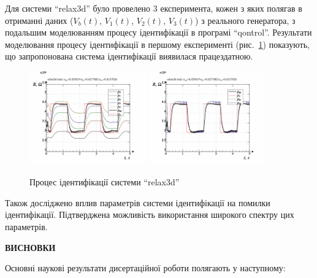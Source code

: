 \documentclass[a4paper,13pt]{atuaref}
\newcommand{\xsect}[1]{\medskip\begin{center}\textbf{#1}\end{center}\medskip\penalty10000}
\begin{document}
Для системи ``relax3d'' було провелено 3 експеримента, кожен з яких полягав в отриманні даних
($ V_b (t) $, $ V_1 (t) $, $ V_2 (t) $, $ V_3(t) $) з реального генератора, з подальшим моделюванням процесу ідентифікації в
програмі ``qontrol''.
Результати моделювання процесу ідентифікації в першому експерименті
(рис.~\ref{atu:f:relax3d_id_1}) показують, що запропонована система
ідентифікації виявилася працездатною.

\begin{figure}[htb!]
  \centerline{
    \includegraphics[width=0.45\textwidth]{p7/p/relax3d_read_id2-p_p_00.png}
    \hfill
    \includegraphics[width=0.45\textwidth]{p7/p/relax3d_read_id2-p_pp_00.png}
  }
  \caption{Процес ідентифікації системи ``relax3d''}
  \label{atu:f:relax3d_id_1}
\end{figure}

Також досліджено вплив параметрів системи ідентифікації на помилки ідентифікації.
Підтверджена можливість використання широкого спектру цих параметрів.



\xsect{ВИСНОВКИ}

Основні наукові результати дисертаційної роботи полягають у наступному:
\end{document}
